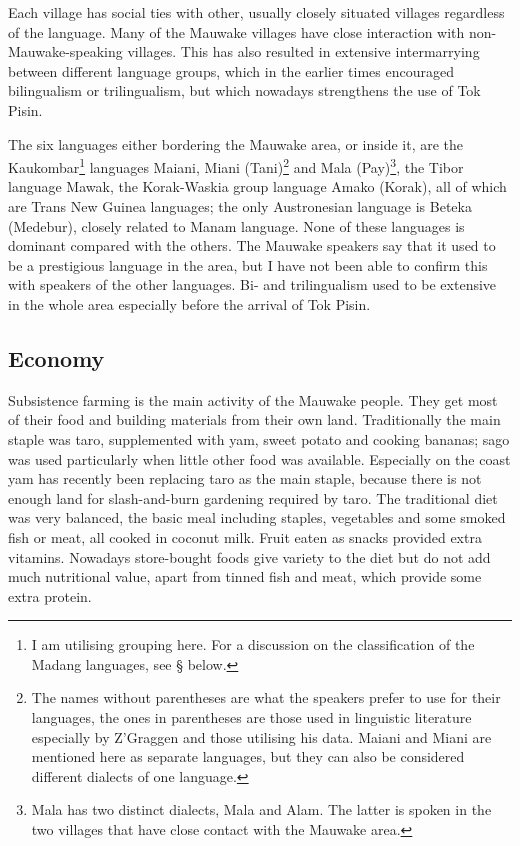 Each village has social ties with other, usually closely situated villages regardless of the language.  Many of the Mauwake villages have close interaction with non-Mauwake-speaking villages.  This has also resulted in extensive intermarrying between different language groups, which in the earlier times encouraged bilingualism or trilingualism, but which nowadays strengthens the use of Tok Pisin.

The six languages either bordering the Mauwake area, or inside it, are the Kaukombar\footnote{I am utilising  grouping here. For a discussion on the classification of the Madang languages, see {\S} below.} languages Maiani, Miani (Tani)\footnote{The names without parentheses are what the speakers prefer to use for their languages, the ones in parentheses are those used in linguistic literature especially by Z'Graggen and those utilising his data. Maiani and Miani are mentioned here as separate languages, but they can also be considered different dialects of one language.}  and Mala (Pay)\footnote{Mala has two distinct dialects, Mala and Alam. The latter is spoken in the two villages that have close contact with the Mauwake area.}, the Tibor language Mawak, the Korak-Waskia group language Amako (Korak), all of which are Trans New Guinea languages; the only Austronesian language is Beteka (Medebur), closely related to Manam language. None of these languages is dominant compared with the others.  The Mauwake speakers say that it used to be a prestigious language in the area, but I have not been able to confirm this with speakers of the other languages. Bi- and trilingualism used to be extensive in the whole area especially before the arrival of Tok Pisin. 


\subsection{Economy}
Subsistence farming is the main activity of the Mauwake people. They get most of their food and building materials from their own land.  Traditionally the main staple was taro, supplemented with yam, sweet potato and cooking bananas; sago was used particularly when little other food was available. Especially on the coast yam has recently been replacing taro as the main staple, because there is not enough land for slash-and-burn gardening required by taro. The traditional diet was very balanced, the basic meal including staples, vegetables and some smoked fish or meat, all cooked in coconut milk. Fruit eaten as snacks provided extra vitamins. Nowadays store-bought foods give variety to the diet but do not add much nutritional value, apart from tinned fish and meat, which provide some extra protein.

